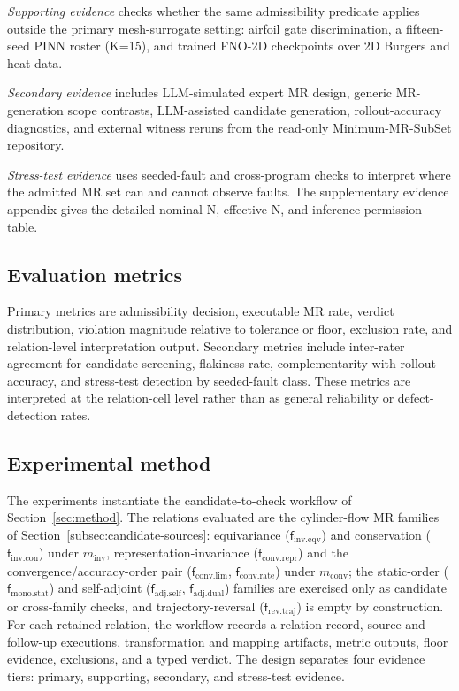 \documentclass[preprint,12pt,authoryear]{elsarticle}
\providecommand{\minv}{m_{\mathrm{inv}}}
\providecommand{\mconv}{m_{\mathrm{conv}}}
\providecommand{\fIeqv}{\mathsf{f}_{\mathrm{inv}.\mathrm{eqv}}}
\providecommand{\fIcon}{\mathsf{f}_{\mathrm{inv}.\mathrm{con}}}
\providecommand{\fAself}{\mathsf{f}_{\mathrm{adj}.\mathrm{self}}}
\providecommand{\fAdual}{\mathsf{f}_{\mathrm{adj}.\mathrm{dual}}}
\providecommand{\fRtraj}{\mathsf{f}_{\mathrm{rev}.\mathrm{traj}}}
\providecommand{\fMstat}{\mathsf{f}_{\mathrm{mono}.\mathrm{stat}}}
\providecommand{\fClim}{\mathsf{f}_{\mathrm{conv}.\mathrm{lim}}}
\providecommand{\fCrate}{\mathsf{f}_{\mathrm{conv}.\mathrm{rate}}}
\providecommand{\fCrepr}{\mathsf{f}_{\mathrm{conv}.\mathrm{repr}}}
\begin{document}
\emph{Supporting evidence} checks whether the same admissibility predicate applies outside the primary mesh-surrogate setting: airfoil gate discrimination, a fifteen-seed PINN roster (K=15), and trained FNO-2D checkpoints over 2D Burgers and heat data.

\emph{Secondary evidence} includes LLM-simulated expert MR design, generic MR-generation scope contrasts, LLM-assisted candidate generation, rollout-accuracy diagnostics, and external witness reruns from the read-only Minimum-MR-SubSet repository.

\emph{Stress-test evidence} uses seeded-fault and cross-program checks to interpret where the admitted MR set can and cannot observe faults. The supplementary evidence appendix gives the detailed nominal-N, effective-N, and inference-permission table.

\subsection{Evaluation metrics}
\label{subsec:metrics}

Primary metrics are admissibility decision, executable MR rate, verdict distribution, violation magnitude relative to tolerance or floor, exclusion rate, and relation-level interpretation output. Secondary metrics include inter-rater agreement for candidate screening, flakiness rate, complementarity with rollout accuracy, and stress-test detection by seeded-fault class. These metrics are interpreted at the relation-cell level rather than as general reliability or defect-detection rates.

\subsection{Experimental method}
\label{subsec:experimental-method}

The experiments instantiate the candidate-to-check workflow of Section~\ref{sec:method}. The relations evaluated are the cylinder-flow MR families of Section~\ref{subsec:candidate-sources}: equivariance ($\fIeqv$) and conservation ($\fIcon$) under $\minv$, representation-invariance ($\fCrepr$) and the convergence/accuracy-order pair ($\fClim$, $\fCrate$) under $\mconv$; the static-order ($\fMstat$) and self-adjoint ($\fAself$, $\fAdual$) families are exercised only as candidate or cross-family checks, and trajectory-reversal ($\fRtraj$) is empty by construction. For each retained relation, the workflow records a relation record, source and follow-up executions, transformation and mapping artifacts, metric outputs, floor evidence, exclusions, and a typed verdict. The design separates four evidence tiers: primary, supporting, secondary, and stress-test evidence.
\end{document}
